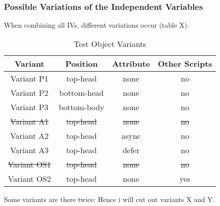 
\subsubsection{Possible Variations of the Independent Variables}

When combining all IVs, different variations occur (table X).



\begin{table}[h]
	\small
	\centering
	\begin{tabular}{  | c || c | c | c | } 
	\hline
	Variant & Position & Attribute & Other Scripts \\
	\hline \hline
	Variant P1 & top-head & \cellcolor{lightgrey} none & \cellcolor{lightgrey} no \\
	   Variant P2 & bottom-head & \cellcolor{lightgrey} none & \cellcolor{lightgrey} no \\
	   Variant P3 & bottom-body & \cellcolor{lightgrey} none & \cellcolor{lightgrey} no \\
	  \hline
	   \sout{Variant A1} & \cellcolor{lightgrey} \sout{top-head} & \sout{none} & \cellcolor{lightgrey} \sout{no} \\
	   Variant A2 & \cellcolor{lightgrey} top-head & async & \cellcolor{lightgrey} no \\
	   Variant A3 & \cellcolor{lightgrey} top-head & defer & \cellcolor{lightgrey} no \\
	  \hline
	  \sout{Variant OS1} & \cellcolor{lightgrey} \sout{top-head} & \cellcolor{lightgrey} \sout{none} & \sout{no} \\
	  Variant OS2 & \cellcolor{lightgrey} top-head & \cellcolor{lightgrey} none & yes \\
	  \hline
	\end{tabular}
	\medskip
	\caption{Test Object Variants}
	\label{table:test_object_variants}
\end{table}


Some variants are there twice:
Hence i will cut out variants X and Y.


